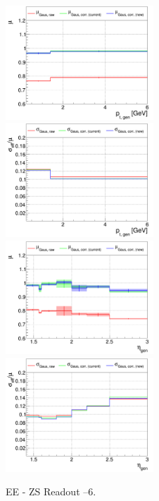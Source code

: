 \begin{figure}
\includegraphics[width=0.495\textwidth]{./plots_pdf/ECAL_plots/plotsPU/EE/ZS/pdf/GENPT/EEZS_GENPT_0000_0006_MuOverBins.pdf}
\includegraphics[width=0.495\textwidth]{./plots_pdf/ECAL_plots/plotsPU/EE/ZS/pdf/GENPT/EEZS_GENPT_0000_0006_EffSigmaOverBins.pdf}
\includegraphics[width=0.495\textwidth]{./plots_pdf/ECAL_plots/plotsPU/EE/ZS/pdf/GENETA/EEZS_GENETA_0000_0006_MuOverBins.pdf}
\includegraphics[width=0.495\textwidth]{./plots_pdf/ECAL_plots/plotsPU/EE/ZS/pdf/GENETA/EEZS_GENETA_0000_0006_EffSigmaOverBins.pdf}
\caption{EE - ZS Readout --6\GeV.}
\label{fig:PU_EEZS}
\end{figure}

